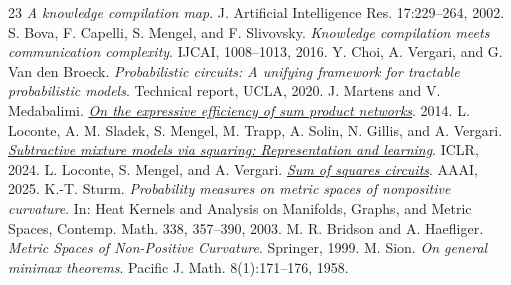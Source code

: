 \documentclass[11pt]{article}
\theoremstyle{remark}
\begin{document}
\begin{thebibliography}{23}
\emph{A knowledge compilation map}.
J. Artificial Intelligence Res. 17:229--264, 2002.
 S. Bova, F. Capelli, S. Mengel, and F. Slivovsky.
\emph{Knowledge compilation meets communication complexity}.
IJCAI, 1008--1013, 2016.
 Y. Choi, A. Vergari, and G. Van den Broeck.
\emph{Probabilistic circuits: A unifying framework for tractable
probabilistic models}. Technical report, UCLA, 2020.
 J. Martens and V. Medabalimi.
\href{https://arxiv.org/abs/1411.7717}{\emph{On the expressive efficiency
of sum product networks}}. 2014.
 L. Loconte, A. M. Sladek, S. Mengel, M. Trapp, A. Solin,
N. Gillis, and A. Vergari.
\href{https://arxiv.org/abs/2310.00724}{\emph{Subtractive mixture models
via squaring: Representation and learning}}. ICLR, 2024.
 L. Loconte, S. Mengel, and A. Vergari.
\href{https://arxiv.org/abs/2408.11778}{\emph{Sum of squares circuits}}.
AAAI, 2025.
 K.-T. Sturm.
\emph{Probability measures on metric spaces of nonpositive curvature}.
In: Heat Kernels and Analysis on Manifolds, Graphs, and Metric Spaces,
Contemp. Math. 338, 357--390, 2003.
 M. R. Bridson and A. Haefliger.
\emph{Metric Spaces of Non-Positive Curvature}. Springer, 1999.
 M. Sion.
\emph{On general minimax theorems}.
Pacific J. Math. 8(1):171--176, 1958.
\end{thebibliography}
\end{document}
